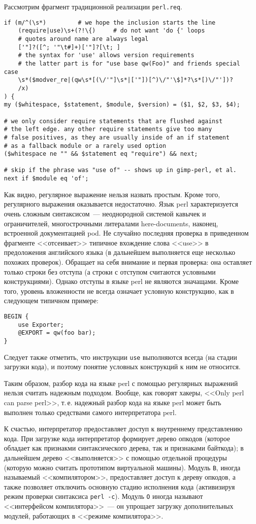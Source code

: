 \documentclass[russian,a4paper,12pt,titlepage]{article}
\begin{document}
Рассмотрим фрагмент традиционной реализации \verb|perl.req|.
\begin{verbatim}
if (m/^(\s*)         # we hope the inclusion starts the line
    (require|use)\s+(?!\{)     # do not want 'do {' loops
    # quotes around name are always legal
    ['"]?([^; '"\t#]+)['"]?[\t; ]
    # the syntax for 'use' allows version requirements
    # the latter part is for "use base qw(Foo)" and friends special case
    \s*($modver_re|(qw\s*[(\/'"]\s*|['"])[^)\/"'\$]*?\s*[)\/"'])?
    /x)
) {
my ($whitespace, $statement, $module, $version) = ($1, $2, $3, $4);

# we only consider require statements that are flushed against
# the left edge. any other require statements give too many
# false positives, as they are usually inside of an if statement
# as a fallback module or a rarely used option
($whitespace ne "" && $statement eq "require") && next;

# skip if the phrase was "use of" -- shows up in gimp-perl, et al.
next if $module eq 'of';
\end{verbatim}
Как видно, регулярное выражение нельзя назвать простым.  Кроме того, регулярного выражения оказывается недостаточно.
Язык perl характеризуется очень сложным синтаксисом~--- неоднородной системой кавычек и ограничителей, многострочными
литералами here-documents, наконец, встроенной документацией pod.  Не случайно последняя проверка в приведенном фрагменте
<<отсеивает>> типичное вхождение слова <<use>> в предоложения английского языка (в дальнейшем выполняется еще несколько
похожих проверок).  Обращает на себя внимание и первая проверка: она оставляет только строки без отступа (а строки с отступом
считаются условными конструкциями).  Однако отступы в языке perl не являются значащами.  Кроме того, уровень вложенности
не всегда означает условную конструкцию, как в следующем типичном примере:
\begin{verbatim}
BEGIN {
    use Exporter;
    @EXPORT = qw(foo bar);
}
\end{verbatim}
Следует также отметить, что инструкции \verb|use| выполняются всегда (на стадии загрузки кода),
и поэтому понятие условных конструкций к ним не относится.

Таким образом, разбор кода на языке perl с помощью регулярных выражений нельзя считать надежным подходом.
Вообще, как говорят хакеры, <<Only perl can parse perl>>, т.\,е. надежный разбор кода на языке perl
может быть выполнен только средствами самого интерпретатора perl.

К счастью, интерпретатор предоставляет доступ к внутреннему представлению кода.  При загрузке кода
интерпретатор формирует дерево опкодов (которое обладает как признакми синтаксического дерева,
так и признаками байткода); в дальнейшем дерево <<выполняется>> с помощью отдельной процедуры (которую
можно считать прототипом виртуальной машины).  Модуль \verb|B|, иногда называемый <<компилятором>>,
предоставляет доступ к дереву опкодов, а также позволяет отключить основную стадию исполнения кода
(активизируя режим проверки синтаксиса \texttt{perl -c}).  Модуль \verb|O| иногда называют <<интерфейсом
компилятора>>~--- он упрощает загрузку дополнительных модулей, работающих в <<режиме компилятора>>.
\end{document}
